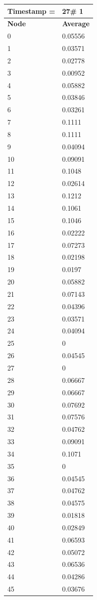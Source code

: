 \begin{tabular}{|l||l|}
\hline
\textbf{Timestamp =} & \textbf{27}\# 1\\\hline
	\textbf{Node} & \textbf{Average} \\ \hline
\hline
	0 & 0.05556 \\ \hline
	1 & 0.03571 \\ \hline
	2 & 0.02778 \\ \hline
	3 & 0.00952 \\ \hline
	4 & 0.05882 \\ \hline
	5 & 0.03846 \\ \hline
	6 & 0.03261 \\ \hline
	7 & 0.1111 \\ \hline
	8 & 0.1111 \\ \hline
	9 & 0.04094 \\ \hline
	10 & 0.09091 \\ \hline
	11 & 0.1048 \\ \hline
	12 & 0.02614 \\ \hline
	13 & 0.1212 \\ \hline
	14 & 0.1061 \\ \hline
	15 & 0.1046 \\ \hline
	16 & 0.02222 \\ \hline
	17 & 0.07273 \\ \hline
	18 & 0.02198 \\ \hline
	19 & 0.0197 \\ \hline
	20 & 0.05882 \\ \hline
	21 & 0.07143 \\ \hline
	22 & 0.04396 \\ \hline
	23 & 0.03571 \\ \hline
	24 & 0.04094 \\ \hline
	25 & 0 \\ \hline
	26 & 0.04545 \\ \hline
	27 & 0 \\ \hline
	28 & 0.06667 \\ \hline
	29 & 0.06667 \\ \hline
	30 & 0.07692 \\ \hline
	31 & 0.07576 \\ \hline
	32 & 0.04762 \\ \hline
	33 & 0.09091 \\ \hline
	34 & 0.1071 \\ \hline
	35 & 0 \\ \hline
	36 & 0.04545 \\ \hline
	37 & 0.04762 \\ \hline
	38 & 0.04575 \\ \hline
	39 & 0.01818 \\ \hline
	40 & 0.02849 \\ \hline
	41 & 0.06593 \\ \hline
	42 & 0.05072 \\ \hline
	43 & 0.06536 \\ \hline
	44 & 0.04286 \\ \hline
	45 & 0.03676 \\ \hline
\end{tabular}
